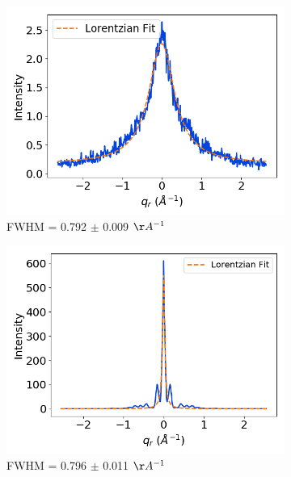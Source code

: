 \documentclass[journal=jpcbfk,manuscript=article]{achemso}
\begin{document}
  \begin{figure}
  \centering
  \begin{subfigure}{0.45\textwidth}
  \includegraphics[width=\textwidth]{exp_rsection_fit.png}
  \caption{FWHM = 0.792 $\pm$ 0.009 $\AA^{-1}$}\label{fig:exp_rsection_fit}
  \end{subfigure}
  \begin{subfigure}{0.45\textwidth}
  \includegraphics[width=\textwidth]{sim_rsection_fit.png}
  \caption{FWHM = 0.796 $\pm$ 0.011 $\AA^{-1}$}\label{fig:sim_rsection_fit}
  \end{subfigure}
  \begin{subfigure}{0.45\textwidth}

\end{subfigure}
\end{figure}
\end{document}
